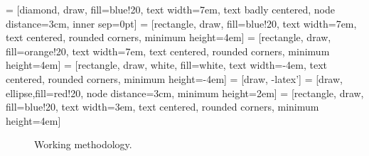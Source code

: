  = [diamond, draw, fill=blue!20, 
       text width=7em, text badly centered, node distance=3cm, inner sep=0pt]
 = [rectangle, draw, fill=blue!20, 
       text width=7em, text centered, rounded corners, minimum height=4em]
 = [rectangle, draw, fill=orange!20, 
       text width=7em, text centered, rounded corners, minimum height=4em]
 = [rectangle, draw, white, fill=white, 
       text width=-4em, text centered, rounded corners, minimum height=-4em]
 = [draw, -latex']
 = [draw, ellipse,fill=red!20, node distance=3cm,
       minimum height=2em]
 = [rectangle, draw, fill=blue!20, 
       text width=3em, text centered, rounded corners, minimum height=4em]

\begin{figure}[h!]
\centering
\begin{adjustbox}{max width=\textwidth}
\end{adjustbox}
\caption{Working methodology.}
\label{methodology}
\end{figure}